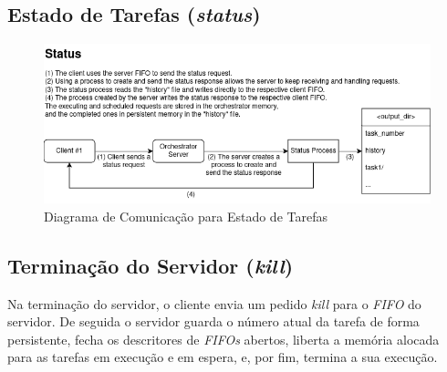\documentclass[a4paper,11pt]{scrreprt}
\begin{document}
        \subsection{Estado de Tarefas (\textit{status})}
            \begin{figure}[!ht]
                \centering
                \includegraphics[width=\textwidth]{diagrams/status.png}
                \caption{\small Diagrama de Comunicação para Estado de Tarefas}
                \label{fig:1.3}
            \end{figure}
        \subsection{Terminação do Servidor (\textit{kill})}
            Na terminação do servidor, o cliente envia um pedido \textit{kill} para o \textit{FIFO} do servidor.
            De seguida o servidor guarda o número atual da tarefa de forma persistente,
            fecha os descritores de \textit{FIFOs} abertos,
            liberta a memória alocada para as tarefas em execução e em espera, e, por fim, termina a
            sua execução.
\end{document}
